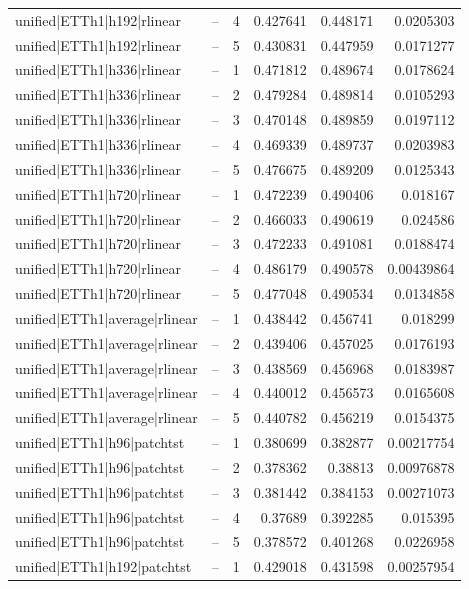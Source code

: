 \begin{longtable}{llrrrr}
unified|ETTh1|h192|rlinear & -- & 4 & 0.427641 & 0.448171 & 0.0205303 \\
unified|ETTh1|h192|rlinear & -- & 5 & 0.430831 & 0.447959 & 0.0171277 \\
unified|ETTh1|h336|rlinear & -- & 1 & 0.471812 & 0.489674 & 0.0178624 \\
unified|ETTh1|h336|rlinear & -- & 2 & 0.479284 & 0.489814 & 0.0105293 \\
unified|ETTh1|h336|rlinear & -- & 3 & 0.470148 & 0.489859 & 0.0197112 \\
unified|ETTh1|h336|rlinear & -- & 4 & 0.469339 & 0.489737 & 0.0203983 \\
unified|ETTh1|h336|rlinear & -- & 5 & 0.476675 & 0.489209 & 0.0125343 \\
unified|ETTh1|h720|rlinear & -- & 1 & 0.472239 & 0.490406 & 0.018167 \\
unified|ETTh1|h720|rlinear & -- & 2 & 0.466033 & 0.490619 & 0.024586 \\
unified|ETTh1|h720|rlinear & -- & 3 & 0.472233 & 0.491081 & 0.0188474 \\
unified|ETTh1|h720|rlinear & -- & 4 & 0.486179 & 0.490578 & 0.00439864 \\
unified|ETTh1|h720|rlinear & -- & 5 & 0.477048 & 0.490534 & 0.0134858 \\
unified|ETTh1|average|rlinear & -- & 1 & 0.438442 & 0.456741 & 0.018299 \\
unified|ETTh1|average|rlinear & -- & 2 & 0.439406 & 0.457025 & 0.0176193 \\
unified|ETTh1|average|rlinear & -- & 3 & 0.438569 & 0.456968 & 0.0183987 \\
unified|ETTh1|average|rlinear & -- & 4 & 0.440012 & 0.456573 & 0.0165608 \\
unified|ETTh1|average|rlinear & -- & 5 & 0.440782 & 0.456219 & 0.0154375 \\
unified|ETTh1|h96|patchtst & -- & 1 & 0.380699 & 0.382877 & 0.00217754 \\
unified|ETTh1|h96|patchtst & -- & 2 & 0.378362 & 0.38813 & 0.00976878 \\
unified|ETTh1|h96|patchtst & -- & 3 & 0.381442 & 0.384153 & 0.00271073 \\
unified|ETTh1|h96|patchtst & -- & 4 & 0.37689 & 0.392285 & 0.015395 \\
unified|ETTh1|h96|patchtst & -- & 5 & 0.378572 & 0.401268 & 0.0226958 \\
unified|ETTh1|h192|patchtst & -- & 1 & 0.429018 & 0.431598 & 0.00257954 \\

\end{longtable}
